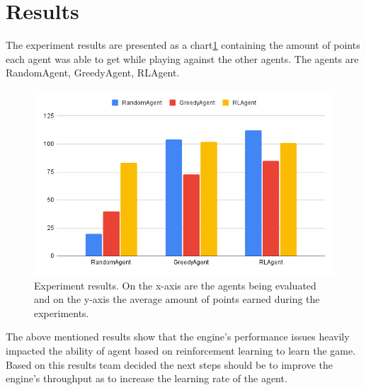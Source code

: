 \section{Results}

The experiment results are presented as a chart\ref{fig:Results} containing the amount of 
points each agent was able to get while playing against the other agents. The agents are
RandomAgent, GreedyAgent, RLAgent.

\begin{figure}[h]
	\includegraphics[width=\linewidth]{figures/chart}
	\caption{Experiment results. On the x-axis are the agents being evaluated and on the y-axis the average amount of points earned during the experiments.}
	\label{fig:Results}
\end{figure}

The above mentioned results show that the engine's performance issues heavily
impacted the ability of agent based on reinforcement learning to learn the game.
Based on this results team decided the next steps should be to improve the engine's
throughput as to increase the learning rate of the agent.
